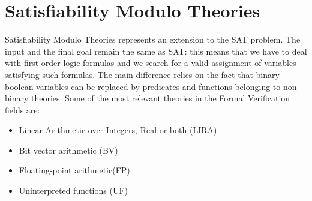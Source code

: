 \section{Satisfiability Modulo Theories}

Satisfiability Modulo Theories represents an extension to the SAT problem. The input and the final goal remain the same as SAT: this means that we have to deal with first-order logic formulas and we search for a valid assignment of variables satisfying such formulas. The main difference relies on the fact that binary boolean variables can be replaced by predicates and functions belonging to non-binary theories. Some of the most relevant theories in the Formal Verification fields are:

\begin{itemize}
    \item Linear Arithmetic over Integers, Real or both (LIRA)
    \item Bit vector arithmetic (BV)
    \item Floating-point arithmetic(FP)
    \item Uninterpreted functions (UF)
\end{itemize}

